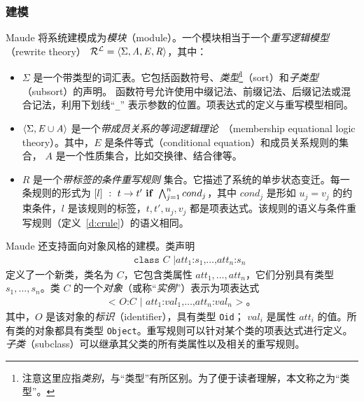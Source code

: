 \subsubsection{建模}
Maude 将系统建模成为\emph{模块}（module）。一个模块相当于一个\emph{重写逻辑模型}（rewrite theory） 
$\mathcal{R^L} = \langle\Sigma,\mathit{A},\mathit{E} , \mathit{R}\rangle$，其中：
\begin{itemize}
\item $\Sigma$ 是一个带类型的词汇表。它包括函数符号、\emph{类型}\footnote{注意这里应指\emph{类别}，与“类型”有所区别。为了便于读者理解，本文称之为“类型”。}（sort）和\emph{子类型}（subsort）的声明。 函数符号允许使用中缀记法、前缀记法、后缀记法或混合记法，利用下划线“\verb|_|” 表示参数的位置。项表达式的定义与重写模型相同。
\item $\langle\Sigma, \mathit{E}\cup\mathit{A}\rangle$ 是一个\emph{带成员关系的等词逻辑理论}~\cite{DBLP:journals/tcs/BouhoulaJM00}（membership equational logic theory）。其中，$\mathit{E}$ 是条件等式（conditional equation）和成员关系规则的集合，
$\mathit{A}$ 是一个性质集合，比如交换律、结合律等。
\item $\mathit{R}$ 是一个\emph{带标签的条件重写规则} 集合。它描述了系统的单步状态变迁。每一条规则的形式为 $[l]~:~t\rightarrow t'\mbox{ \textbf{if}
  }\bigwedge^n_{j=1}cond_j$，其中 $cond_j$ 是形如 $u_j=v_j$ 的约束条件，$l$ 是该规则的标签，$t,t',u_j,v_j$ 都是项表达式。该规则的语义与条件重写规则（定义~\ref{d:crule}）的语义相同。
\end{itemize}

Maude 还支持面向对象风格的建模。类声明
\begin{eqnarray}
& & \texttt{class }C\texttt{ |
}att_1\texttt{:}s_1\texttt{,}\ldots\texttt{,}att_n\texttt{:}s_n \nonumber
\end{eqnarray}
定义了一个新类，类名为 $C$，它包含类属性 $att_1,\ldots,att_n$，它们分别具有类型 $s_1,\ldots,s_n$。类 $C$ 的一个\emph{对象}（或称“\emph{实例}”）表示为项表达式
\begin{eqnarray}
\texttt{< } O\texttt{:} C \texttt{ | }
att_1\texttt{:}val_1\texttt{,} \ldots
\texttt{,}att_n\texttt{:}val_n\texttt{ >} \;\mbox{。} \nonumber
\end{eqnarray}
其中，$O$ 是该对象的\emph{标识}（identifier），具有类型 \verb|Oid|；
$val_i$ 是属性 $att_i$ 的值。所有类的对象都具有类型 \verb|Object|。重写规则可以针对某个类的项表达式进行定义。\emph{子类}（subclass）可以继承其父类的所有类属性以及相关的重写规则。

